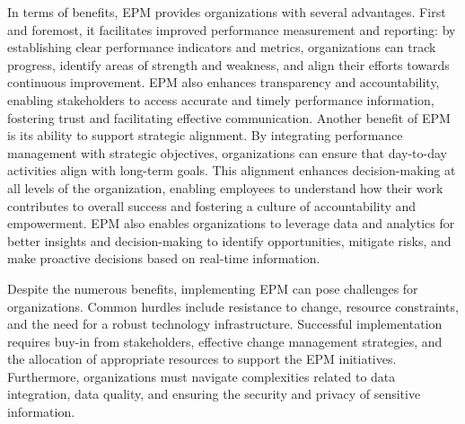 \documentclass[12pt,a4paper,openright,twoside]{book}
\begin{document}
In terms of benefits, EPM provides organizations with several advantages. 
%
First and foremost, it facilitates improved performance measurement and reporting: by establishing clear performance indicators and metrics, organizations can track progress, identify areas of strength and weakness, and align their efforts towards continuous improvement. 
%
EPM also enhances transparency and accountability, enabling stakeholders to access accurate and timely performance information, fostering trust and facilitating effective communication.
%
Another benefit of EPM is its ability to support strategic alignment. 
%
By integrating performance management with strategic objectives, organizations can ensure that day-to-day activities align with long-term goals. 
%
This alignment enhances decision-making at all levels of the organization, enabling employees to understand how their work contributes to overall success and fostering a culture of accountability and empowerment.
%
EPM also enables organizations to leverage data and analytics for better insights and decision-making to identify opportunities, mitigate risks, and make proactive decisions based on real-time information.

Despite the numerous benefits, implementing EPM can pose challenges for organizations. 
%
Common hurdles include resistance to change, resource constraints, and the need for a robust technology infrastructure. 
%
Successful implementation requires buy-in from stakeholders, effective change management strategies, and the allocation of appropriate resources to support the EPM initiatives. 
%
Furthermore, organizations must navigate complexities related to data integration, data quality, and ensuring the security and privacy of sensitive information.
\end{document}

